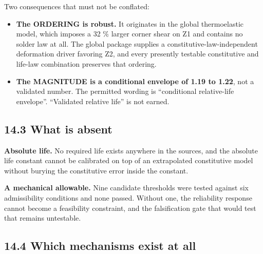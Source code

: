\documentclass[10pt,]{article}
\providecommand{\tightlist}{%
  \setlength{\itemsep}{0pt}\setlength{\parskip}{0pt}}
\begin{document}
Two consequences that must not be conflated:

\begin{itemize}
\tightlist
\item
  \textbf{The ORDERING is robust.} It originates in the global
  thermoelastic model, which imposes a 32 \% larger corner shear on Z1
  and contains no solder law at all. The global package supplies a
  constitutive-law-independent deformation driver favoring Z2, and every
  presently testable constitutive and life-law combination preserves
  that ordering.
\item
  \textbf{The MAGNITUDE is a conditional envelope of 1.19 to 1.22}, not
  a validated number. The permitted wording is ``conditional
  relative-life envelope''. ``Validated relative life'' is not earned.
\end{itemize}

\hypertarget{what-is-absent}{%
\subsection{14.3 What is absent}\label{what-is-absent}}

\textbf{Absolute life.} No required life exists anywhere in the sources,
and the absolute life constant cannot be calibrated on top of an
extrapolated constitutive model without burying the constitutive error
inside the constant.

\textbf{A mechanical allowable.} Nine candidate thresholds were tested
against six admissibility conditions and none passed. Without one, the
reliability response cannot become a feasibility constraint, and the
falsification gate that would test that remains untestable.

\hypertarget{which-mechanisms-exist-at-all}{%
\subsection{14.4 Which mechanisms exist at
all}\label{which-mechanisms-exist-at-all}}
\end{document}

